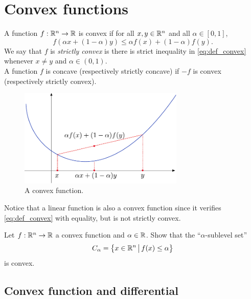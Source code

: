 \documentclass[11pt,nocut]{article}
\begin{document}
\section{Convex functions}

\begin{definition}
	A function $f: \mathbb{R}^n \to \mathbb{R}$ is convex if for all $x,y \in \mathbb{R}^n$ and all $\alpha \in [0,1]$,
	\begin{equation}\label{eq:def_convex}
	f(\alpha x + (1-\alpha) y) \leq \alpha f(x) + (1-\alpha) f(y).
\end{equation}
We say that $f$ is \emph{strictly convex} is there is strict inequality in \eqref{eq:def_convex} whenever $x \neq y$ and $\alpha \in (0,1)$.
\\
A function $f$ is concave (respectively strictly concave) if $-f$ is convex (respectively strictly convex).
\end{definition}
\begin{figure}[h!]
	\begin{center}
	\includegraphics[width=0.7\textwidth]{figures/convex_function.pdf}
	\end{center}
	\caption{A convex function.}
\end{figure}

Notice that a linear function is also a convex function since it verifies \eqref{eq:def_convex} with equality, but is not strictly convex.


\begin{exercise}
	Let $f : \mathbb{R}^n \to \mathbb{R}$ a convex function and $\alpha \in \mathbb{R}$. Show that the ``$\alpha$-sublevel set''
	$$
	C_{\alpha} = \big\{ x \in \mathbb{R}^n \, \big| \, f(x) \leq \alpha \big\}
	$$
	is convex.
\end{exercise}



\subsection{Convex function and differential}
\end{document}
